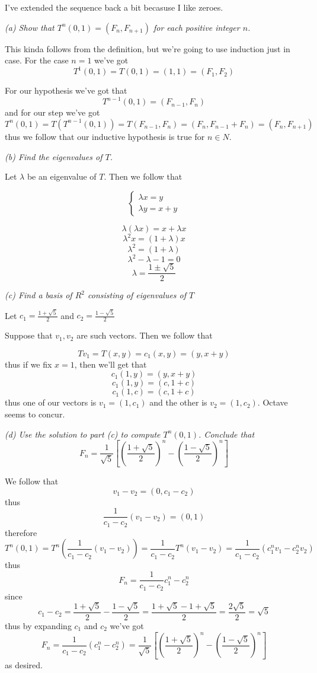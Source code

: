 \documentclass[11pt,oneside,titlepage]{book}
\begin{document}
I've extended the sequence back a bit becasuse I like zeroes.

\textit{(a) Show that $T^n(0, 1) = (F_n, F_{n + 1})$ for each positive integer $n$.}

This kinda follows from the definition, but we're going to use induction just in case. For
the case $n = 1$ we've got
$$T^1(0, 1) = T(0, 1) = (1, 1) = (F_1, F_2)$$

For our hypothesis we've got that
$$T^{n - 1}(0, 1) = (F_{n - 1}, F_n) $$
and for our step we've got
$$T^n(0, 1) = T(T^{n - 1}(0, 1)) = T(F_{n - 1}, F_n) = (F_n, F_{n - 1} + F_n) =
(F_n, F_{n + 1})$$
thus we follow that our inductive hypothesis is true for $n \in N$.

\textit{(b) Find the eigenvalues of $T$.}

Let $\lambda$ be an eigenvalue of $T$. Then we follow that

$$
\begin{cases}
  \lambda x = y \\
  \lambda y = x + y
\end{cases}
$$

$$\lambda (\lambda x) = x + \lambda x$$
$$\lambda^2  x = (1 + \lambda )x$$
$$\lambda^2 = (1 + \lambda )$$
$$\lambda^2 - \lambda - 1 = 0$$
$$\lambda = \frac{1 \pm \sqrt{5}}{2}$$

\textit{(c) Find a basis of $R^2$ consisting of eigenvalues of $T$}

Let $c_1 = \frac{1 + \sqrt{5}}{2}$ and $c_2 = \frac{1 - \sqrt{5}}{2}$

Suppose that $v_1, v_2$ are such vectors. Then we follow that

$$Tv_1 = T(x, y) = c_1(x, y) = (y, x + y)$$
thus if we fix $x = 1$, then we'll get that 
$$c_1(1, y) = (y, x + y)$$
$$c_1(1, y) = (c, 1 + c)$$
$$c_1(1, c) = (c, 1 + c)$$
thus one of our vectors is $v_1 = (1, c_1)$ and the other is $v_2 = (1, c_2)$.
Octave seems to concur.

\textit{(d) Use the solution to part (c) to compute $T^n(0, 1)$. Conclude that}
$$F_n = \frac{1}{\sqrt{5}}\left[\left(\frac{1 + \sqrt{5}}{2}\right)^n -
  \left(\frac{1 - \sqrt{5}}{2}\right)^n \right]$$

We follow that
$$v_1 - v_2 = (0, c_1 - c_2)$$
thus
$$\frac{1}{c_1 - c_2}(v_1 - v_2) = (0, 1)$$
therefore
$$T^n(0, 1) = T^n(\frac{1}{c_1 - c_2}(v_1 - v_2)) =
\frac{1}{c_1 - c_2} T^n(v_1 - v_2) = \frac{1}{c_1 - c_2} (c_1^n v_1 - c_2^n v_2)$$
thus
$$F_n = \frac{1}{c_1 - c_2} c_1^n  - c_2^n $$
since
$$c_1 - c_2 = \frac{1 + \sqrt{5}}{2} - \frac{1 - \sqrt{5}}{2} =
\frac{1 + \sqrt{5} - 1 + \sqrt{5}}{2} = \frac{2\sqrt{5}}{2} = \sqrt{5}$$
thus by expanding $c_1$ and $c_2$ we've got 
$$F_n = \frac{1}{c_1 - c_2} (c_1^n  - c_2^n) =
\frac{1}{\sqrt{5}}\left[\left(\frac{1 + \sqrt{5}}{2}\right)^n -
  \left(\frac{1 - \sqrt{5}}{2}\right)^n \right]$$
as desired.
\end{document}
